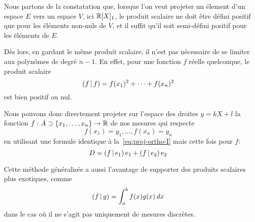 Nous partons de la constatation que, lorsque l'on veut projeter
un élement d'un espace $E$ vers un espace $V$, ici $\mathbb{R}[X]_1$,
le produit scalaire ne doit être défini positif que
pour les éléments non-nuls de $V$, et il suffit qu'il soit semi-défini
positif pour les éléments de $E$.
\cite{semi-def-pos}

Dès lors, en gardant le même produit scalaire, il n'est pas nécessaire
de se limiter aux polynômes de degré $n-1$.
En effet, pour une fonction $f$ réelle quelconque, le produit
scalaire
\[
    \left(f\,\middle|\,f\right) = f(x_1)^2+\cdots+f(x_n)^2
\]
est bien positif ou nul.

Nous pouvons donc directement projeter sur l'espace des droites $y=kX+l$
la fonction $f:A \supset \{x_1,\ldots,x_n\} \to \mathbb{R}$ de nos mesures
qui respecte
\[
    f(x_1) = y_1, \ldots, f(x_n) = y_n
\]
en utilisant une formule identique à
la~\eqref{eq:proj-ortho-I} mais cette fois pour $f$:
\begin{equation}
    D = \left(f\,\middle|\,e_1\right)e_1 + \left(f\,\middle|\,e_2\right)e_2
\end{equation}

Cette méthode généralisée a aussi l'avantage de supporter
des produits scalaires plus exotiques,
comme
\[
    \left(f\,\middle|\,g\right) = \int_a^b{f(x)g(x)\,dx}
\]
dans le cas où il ne s'agit pas uniquement de mesures discrètes.
